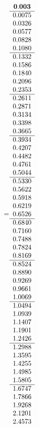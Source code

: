 =\hbox{$\begin{array}{c}
\bf 0.003 
 \\ \hline 
  0.0075 \\ 
  0.0326 \\ 
  0.0577 \\ 
  0.0828 \\ 
  0.1080
 \\ \hline 
  0.1332 \\ 
  0.1586 \\ 
  0.1840 \\ 
  0.2096 \\ 
  0.2353
 \\ \hline 
  0.2611 \\ 
  0.2871 \\ 
  0.3134 \\ 
  0.3398 \\ 
  0.3665
 \\ \hline 
  0.3934 \\ 
  0.4207 \\ 
  0.4482 \\ 
  0.4761 \\ 
  0.5044
 \\ \hline 
  0.5330 \\ 
  0.5622 \\ 
  0.5918 \\ 
  0.6219 \\ 
  0.6526
 \\ \hline 
  0.6840 \\ 
  0.7160 \\ 
  0.7488 \\ 
  0.7824 \\ 
  0.8169
 \\ \hline 
  0.8524 \\ 
  0.8890 \\ 
  0.9269 \\ 
  0.9661 \\ 
  1.0069
 \\ \hline 
  1.0494 \\ 
  1.0939 \\ 
  1.1407 \\ 
  1.1901 \\ 
  1.2426
 \\ \hline 
  1.2988 \\ 
  1.3595 \\ 
  1.4255 \\ 
  1.4985 \\ 
  1.5805
 \\ \hline 
  1.6747 \\ 
  1.7866 \\ 
  1.9268 \\ 
  2.1201 \\ 
  2.4573
 \end{array}$}
